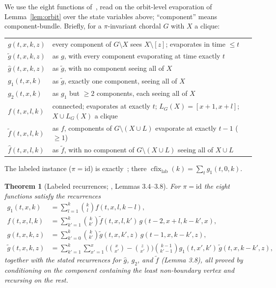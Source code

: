 \documentclass[11pt]{article}
\theoremstyle{plain}
\newtheorem{theorem}{Theorem}
\theoremstyle{definition}
\DeclareMathOperator{\cfix}{cfix}
\newcommand{\gtil}{\tilde g}
\newcommand{\ghat}{\hat g}
\newcommand{\ftil}{\tilde f}
\newcommand{\fhat}{\hat f}
\begin{document}
We use the eight functions of~\cite[Def.\ 3.3]{HLV2023}, read on the orbit-level evaporation of
Lemma~\ref{lem:orbit} over the state variables above; ``component'' means component-bundle. Briefly,
for a $\pi$-invariant chordal $G$ with $X$ a clique:
\begin{center}\small
\begin{tabular}{ll}
\toprule
$g(t,x,k,z)$ & every component of $G\setminus X$ sees $X\setminus[z]$; evaporates in time $\le t$\\
$\gtil(t,x,k,z)$ & as $g$, with every component evaporating at time exactly $t$\\
$\ghat(t,x,k,z)$ & as $\gtil$, with no component seeing all of $X$\\
$g_1(t,x,k)$ & as $\gtil$, exactly one component, seeing all of $X$\\
$g_2(t,x,k)$ & as $g_1$ but $\ge 2$ components, each seeing all of $X$\\
$f(t,x,l,k)$ & connected; evaporates at exactly $t$; $L_G(X)=[x{+}1,x{+}l]$; $X\cup L_G(X)$ a clique\\
$\ftil(t,x,l,k)$ & as $f$, components of $G\setminus(X\cup L)$ evaporate at exactly $t{-}1$ ($\ge1$)\\
$\fhat(t,x,l,k)$ & as $\ftil$, with no component of $G\setminus(X\cup L)$ seeing all of $X\cup L$\\
\bottomrule
\end{tabular}
\end{center}
The labeled instance ($\pi=\mathrm{id}$) is exactly~\cite{HLV2023}; there
$\cfix_{\mathrm{lab}}(k)=\sum_t g_1(t,0,k)$.

\begin{theorem}[Labeled recurrences; \cite{HLV2023}, Lemmas 3.4--3.8]\label{thm:hlv}
For $\pi=\mathrm{id}$ the eight functions satisfy the recurrences
\begin{align*}
g_1(t,x,k)&=\textstyle\sum_{l=1}^{k}\binom{k}{l}f(t,x,l,k{-}l),\\
f(t,x,l,k)&=\textstyle\sum_{k'=1}^{k}\binom{k}{k'}\ftil(t,x,l,k')\,g(t{-}2,x{+}l,k{-}k',x),\\
g(t,x,k,z)&=\textstyle\sum_{k'=0}^{k}\binom{k}{k'}\gtil(t,x,k',z)\,g(t{-}1,x,k{-}k',z),\\
\gtil(t,x,k,z)&=\textstyle\sum_{k'=1}^{k}\sum_{x'=1}^{x}\!\big(\binom{x}{x'}{-}\binom{z}{x'}\big)\binom{k-1}{k'-1}g_1(t,x',k')\,\gtil(t,x,k{-}k',z),
\end{align*}
together with the stated recurrences for $\ghat$, $g_2$, and $\ftil$ (Lemma 3.8), all proved by
conditioning on the component containing the least non-boundary vertex and recursing on the rest.
\end{theorem}
\end{document}
